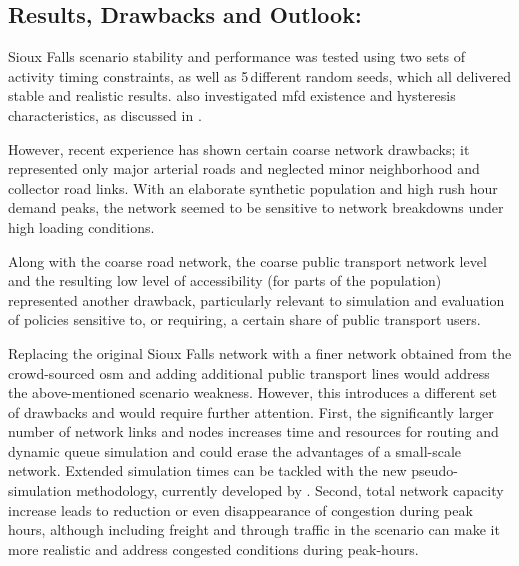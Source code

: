 \subsection{Results, Drawbacks and Outlook:}
Sioux Falls scenario stability and performance was tested using two sets of activity timing constraints, as well as 5\,different random seeds, which all delivered stable and realistic results. \citet[][]{ChakirovFourie_TechRep_FCL_2014} also investigated \gls{mfd} existence and hysteresis characteristics, as discussed in \citet[][]{GeroliminisDaganzo_TRB_2007, GeroliminisDaganzo_TransResB_2008, GeroliminisSun_TransResA_2011}. 

However, recent experience has shown certain coarse network drawbacks; it represented only major arterial roads and neglected minor neighborhood and collector road links. With an elaborate synthetic population and high rush hour demand peaks, the network seemed to be sensitive to network breakdowns under high loading conditions. 

Along with the coarse road network, the coarse public transport network level and the resulting  low level of accessibility (for parts of the population) represented another drawback, particularly relevant to simulation and evaluation of policies sensitive to, or requiring, a certain share of public transport users. 

Replacing the original Sioux Falls network with a finer network obtained from the crowd-sourced \gls{osm} and adding additional public transport lines would address the above-mentioned scenario weakness. However, this introduces a different set of drawbacks and would require further attention. First, the significantly larger number of network links and nodes increases time and resources for routing and dynamic queue simulation and could erase the advantages of a small-scale network. Extended simulation times can be tackled with the new pseudo-simulation methodology, currently developed by \citet[][]{FourieEtAl_TRR_2013}.
Second, total network capacity increase leads to reduction or even disappearance of congestion during peak hours, although including freight and through traffic in the scenario can make it more realistic and address congested conditions during peak-hours. 

